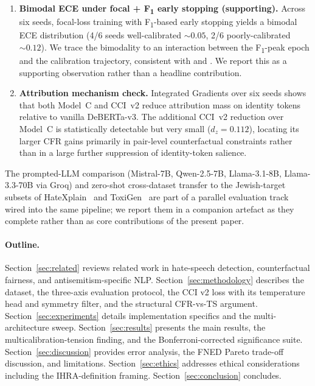 \documentclass[10pt,a4paper]{article}
\begin{document}
\begin{enumerate}[leftmargin=*,itemsep=2pt]
    \item \textbf{Bimodal ECE under focal + F\textsubscript{1} early stopping (supporting).} Across six seeds, focal-loss training with F\textsubscript{1}-based early stopping yields a bimodal ECE distribution (4/6 seeds well-calibrated $\sim 0.05$, 2/6 poorly-calibrated $\sim 0.12$). We trace the bimodality to an interaction between the F\textsubscript{1}-peak epoch and the calibration trajectory, consistent with \citet{mukhoti2020calibrating} and \citet{tao2023pcs}. We report this as a supporting observation rather than a headline contribution.
    \item \textbf{Attribution mechanism check.} Integrated Gradients over six seeds shows that both Model~C and CCI~v2 reduce attribution mass on identity tokens relative to vanilla DeBERTa-v3. The additional CCI~v2 reduction over Model~C is statistically detectable but very small ($d_z=0.112$), locating its larger CFR gains primarily in pair-level counterfactual constraints rather than in a large further suppression of identity-token salience.
\end{enumerate}

The prompted-LLM comparison (Mistral-7B, Qwen-2.5-7B, Llama-3.1-8B, Llama-3.3-70B via Groq) and zero-shot cross-dataset transfer to the Jewish-target subsets of HateXplain~\citep{mathew2021hatexplain} and ToxiGen~\citep{hartvigsen2022toxigen} are part of a parallel evaluation track wired into the same pipeline; we report them in a companion artefact as they complete rather than as core contributions of the present paper.

\paragraph{Outline.}
Section~\ref{sec:related} reviews related work in hate-speech detection, counterfactual fairness, and antisemitism-specific NLP. Section~\ref{sec:methodology} describes the dataset, the three-axis evaluation protocol, the CCI v2 loss with its temperature head and symmetry filter, and the structural CFR-vs-TS argument. Section~\ref{sec:experiments} details implementation specifics and the multi-architecture sweep. Section~\ref{sec:results} presents the main results, the multicalibration-tension finding, and the Bonferroni-corrected significance suite. Section~\ref{sec:discussion} provides error analysis, the FNED Pareto trade-off discussion, and limitations. Section~\ref{sec:ethics} addresses ethical considerations including the IHRA-definition framing. Section~\ref{sec:conclusion} concludes.
\end{document}
